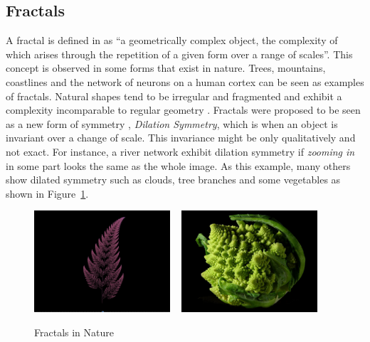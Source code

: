

\subsection{Fractals} %
\label{sub:fractals}


A fractal is defined in \cite{Ebert2002} as ``a geometrically complex object, the complexity of which arises through the repetition of a given form over a range of scales''.
This concept is observed in some forms that exist in nature. Trees, mountains, coastlines and the network of neurons on a human cortex can be seen as examples of fractals. Natural shapes tend to be irregular and fragmented and exhibit a complexity incomparable to regular geometry \cite{mandelbrot1984fractal}.
Fractals were proposed to be seen as a new form of symmetry \cite{Ebert2002}, \emph{Dilation Symmetry}, which is when an object is invariant over a change of scale. This invariance might be only qualitatively and not exact. For instance, a river network exhibit dilation symmetry if \textit{zooming in} in some part looks the same as the whole image. As this example, many others show dilated symmetry such as clouds, tree branches and some vegetables as shown in Figure~\ref{fig:NFractals}. 

\begin{figure}
        \centering
                \includegraphics[width=0.45\textwidth]{images/Theory/Fractals/Leaf.png}
        ~ %
                \includegraphics[width=0.45\textwidth]{images/Theory/Fractals/Fractal_Broccoli.jpg}
        \caption{Fractals in Nature}
        \label{fig:NFractals}
\end{figure}


